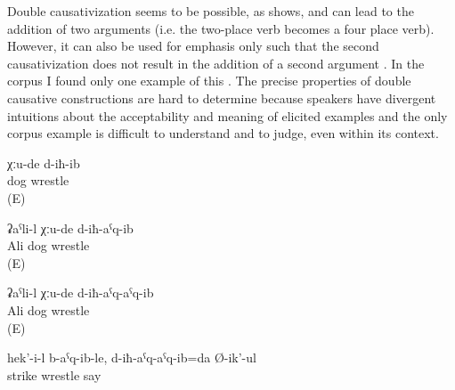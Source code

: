 Double causativization seems to be possible, as  shows, and can lead to the addition of two arguments (i.e. the two-place verb  becomes a four place verb). However, it can also be used for emphasis only such that the second causativization does not result in the addition of a second argument . In the corpus I found only one example of this . The precise properties of double causative constructions are hard to determine because speakers have divergent intuitions about the acceptability and meaning of elicited examples and the only corpus example  is difficult to understand and to judge, even within its context.
%
\begin{exe}
	\ex	\label{ex:The dogs fought}
	\gll	χːu-de d-iħ-ib\\
		dog	wrestle\\
	\glt	{} (E)

	\ex	\label{ex:Ali made the dogs fight}
	\gll	ʡaˁli-l χːu-de d-iħ-aˁq-ib\\
		Ali dog	wrestle\\
	\glt	{} (E)

	\ex	\label{ex:Ali made the dogs fight UNCERTAIN INTERPRETATION}
	\gll	ʡaˁli-l χːu-de d-iħ-aˁq-aˁq-ib\\
		Ali dog	wrestle\\
	\glt	{}  (E)

	\ex	\label{ex:‎He hit her and (we) were made to fight, he says}
	\gll	hek'-i-l	b-aˁq-ib-le,	d-iħ-aˁq-aˁq-ib=da	Ø-ik'-ul\\
			strike	wrestle	say\\
	\glt	{}
\end{exe}

